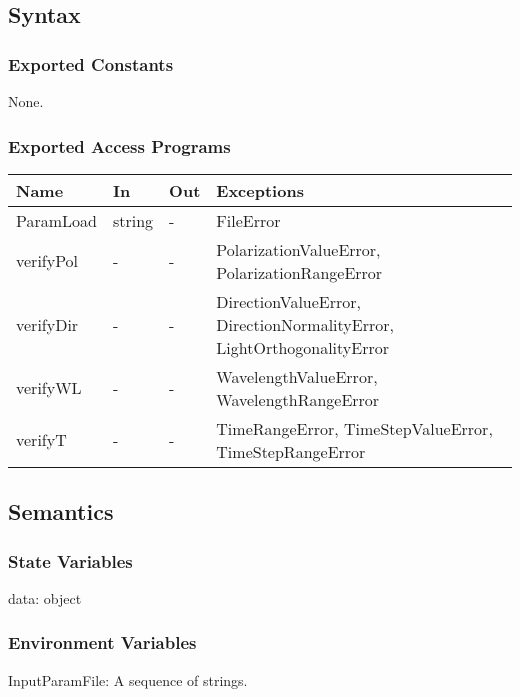 \documentclass[12pt, titlepage]{article}
\begin{document}
\subsection{Syntax}

\subsubsection{Exported Constants}
None.

\subsubsection{Exported Access Programs}

\begin{center}
	\begin{tabular}{p{3cm} p{2cm} p{2cm} p{6cm}}
		\hline
		\textbf{Name} & \textbf{In} & \textbf{Out} & \textbf{Exceptions} \\
		\hline
		ParamLoad & string & - & FileError \\
		
		verifyPol & - & - & PolarizationValueError, PolarizationRangeError\\
		
		verifyDir & - & - & DirectionValueError, DirectionNormalityError, LightOrthogonalityError\\
		
		verifyWL & - & - & WavelengthValueError, WavelengthRangeError\\
		
		verifyT & - & - & TimeRangeError, TimeStepValueError, TimeStepRangeError\\
	
		\hline
	\end{tabular}
\end{center}

\subsection{Semantics}

\subsubsection{State Variables}

data: object

\subsubsection{Environment Variables}
InputParamFile: A sequence of strings. 
\end{document}
